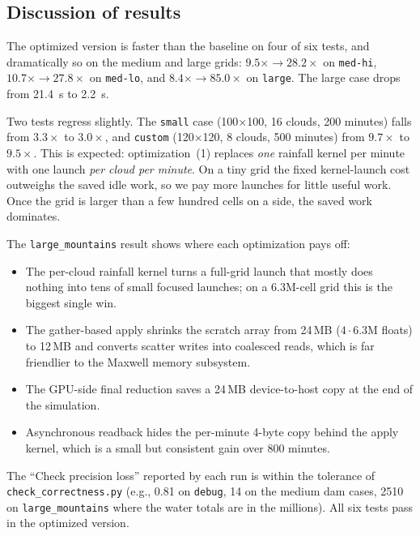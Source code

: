 \documentclass[sigconf, nonacm, review]{acmart}
\begin{document}
\subsection{Discussion of results}
The optimized version is faster than the baseline on four of six
tests, and dramatically so on the medium and large grids:
$9.5\times{\rightarrow}28.2\times$ on \texttt{med-hi},
$10.7\times{\rightarrow}27.8\times$ on \texttt{med-lo}, and
$8.4\times{\rightarrow}85.0\times$ on \texttt{large}. The large
case drops from 21.4~s to 2.2~s.

Two tests regress slightly. The \texttt{small} case
(100$\times$100, 16 clouds, 200 minutes) falls from $3.3\times$
to $3.0\times$, and \texttt{custom} (120$\times$120, 8 clouds,
500 minutes) from $9.7\times$ to $9.5\times$. This is expected:
optimization~(1) replaces \emph{one} rainfall kernel per minute
with one launch \emph{per cloud per minute}. On a tiny grid the
fixed kernel-launch cost outweighs the saved idle work, so we
pay more launches for little useful work. Once the grid is
larger than a few hundred cells on a side, the saved work
dominates.

The \texttt{large\_mountains} result shows where each
optimization pays off:

\begin{itemize}
  \item The per-cloud rainfall kernel turns a full-grid launch
    that mostly does nothing into tens of small focused launches;
    on a 6.3M-cell grid this is the biggest single win.
  \item The gather-based apply shrinks the scratch array from
    24\,MB ($4{\cdot}6.3$M floats) to 12\,MB and converts scatter
    writes into coalesced reads, which is far friendlier to the
    Maxwell memory subsystem.
  \item The GPU-side final reduction saves a 24\,MB
    device-to-host copy at the end of the simulation.
  \item Asynchronous readback hides the per-minute 4-byte copy
    behind the apply kernel, which is a small but consistent gain
    over 800 minutes.
\end{itemize}

The ``Check precision loss'' reported by each run is within the
tolerance of \texttt{check\_correctness.py} (e.g., 0.81 on
  \texttt{debug}, 14 on the medium dam cases, 2510 on
  \texttt{large\_mountains} where the water totals are in the
millions). All six tests pass in the optimized version.
\end{document}
